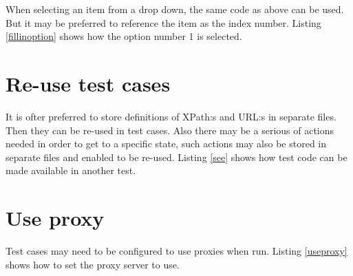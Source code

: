 \documentclass[a4paper,11pt]{kth-mag}
\begin{document}
\lstset{basicstyle=\footnotesize, caption=Fill in text field in formular with unique string of specific length and start, label=fillinuniquelengthstart, numbers=left, frame=single, captionpos=b, breaklines=true}


When selecting an item from a drop down, the same code as above can be used. But it may be preferred to reference the item as the index number. Listing \ref{fillinoption} shows how the option number 1 is selected.

\lstset{basicstyle=\footnotesize, caption=Fill in option by index number, label=fillinoption, numbers=left, frame=single, captionpos=b, breaklines=true}


\section{Re-use test cases}
It is ofter preferred to store definitions of XPath:s and URL:s in separate files. Then they can be re-used in test cases. Also there may be a serious of actions needed in order to get to a specific state, such actions may also be stored in separate files and enabled to be re-used. Listing \ref{see} shows how test code can be made available in another test.

\lstset{basicstyle=\footnotesize, caption=See statement, label=see, numbers=left, frame=single, captionpos=b, breaklines=true}


\section{Use proxy}
Test cases may need to be configured to use proxies when run. Listing \ref{useproxy} shows how to set the proxy server to use.

\lstset{basicstyle=\footnotesize, caption=Use proxy statement, label=useproxy, numbers=left, frame=single, captionpos=b, breaklines=true}

\end{document}
